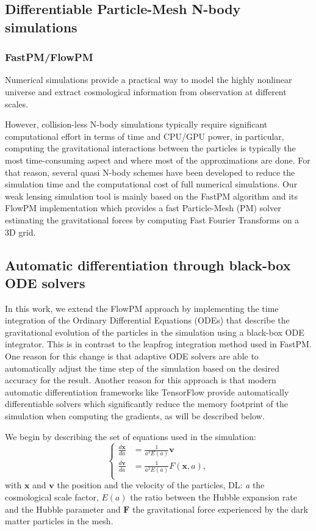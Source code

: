 \documentclass[twocolumn,twocolappendix]{aastex63}
\newcommand{\denise}[1]{{\color{red}DL: #1}}
\begin{document}
\subsection{Differentiable Particle-Mesh N-body simulations}
\subsubsection{FastPM/FlowPM}

Numerical simulations provide a practical way to model the highly nonlinear universe and extract cosmological information from observation at different scales. 

However, collision-less N-body simulations typically require significant computational effort in terms of time and CPU/GPU power, in particular, computing the gravitational interactions between the particles is typically the most time-consuming aspect and where most of the approximations are done. 
For that reason, several quasi N-body schemes have been developed to reduce the simulation time and the computational cost of full numerical simulations. 
Our weak lensing simulation tool is mainly based on the FastPM algorithm \citep{2019ascl.soft05010F} and its FlowPM \citep{modi2021flowpm} implementation which provides a fast Particle-Mesh (PM) solver estimating the gravitational forces by computing Fast Fourier Transforms on a 3D grid.

\subsection{Automatic differentiation through black-box ODE solvers}\label{Backpropagation_of_ODE_solutions}
In this work, we extend the FlowPM approach by implementing the time integration of the Ordinary Differential Equations
(ODEs) that describe the gravitational evolution of the particles in the simulation using a black-box ODE integrator. This is in contrast to the leapfrog integration method used in FastPM. One reason for this change is that adaptive ODE solvers are able to automatically adjust the time step of the simulation based on the desired accuracy for the result. Another reason for this approach is that modern automatic differentiation frameworks like TensorFlow provide automatically differentiable solvers which significantly reduce the memory footprint of the simulation when computing the gradients, as will be described below.


We begin by describing the set of equations used in the simulation:
\begin{equation}
    \left\{ \begin{array}{ll}
        \frac{d \mathbf{x}}{d a} & = \frac{1}{a^3 E(a)} \mathbf{v} \\
        \frac{d \mathbf{v}}{d a} & =  \frac{1}{a^2 E(a)} F(\mathbf{x}, a), \\
    \end{array} \right.
\end{equation}
with $\mathbf{x}$ and $\mathbf{v}$ the position and the velocity of the particles, \denise{\textit{a} the cosmological scale factor, $E(a)$ the ratio between the Hubble expansion rate and the Hubble parameter and $\mathbf{F}$ the gravitational force experienced by the dark matter particles in the mesh.}
\end{document}
